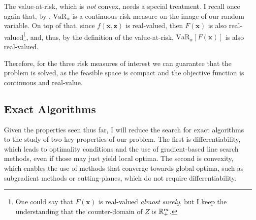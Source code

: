 \documentclass[12pt]{article}
\begin{document}
The value-at-risk, which is \emph{not} convex, needs a special treatment.
I recall once again that, by \citet[Theorem~2]{ivanovBilevelStochasticLinear2014}, $\text{VaR}_{\alpha}$ is a continuous risk measure on the image of our random variable.
On top of that, since $f(\bm{x},\bm{z})$ is real-valued, then $F(\bm{x})$ is also real-valued\footnote{One could say that $F(\bm{x})$ is real-valued \emph{almost surely}, but I keep the understanding that the counter-domain of $Z$ is $\mathbb{R}^{m}_{+}$.}, and, thus, by the definition of the value-at-risk, $\text{VaR}_{\alpha}[F(\bm{x})]$ is also real-valued.

Therefore, for the three risk measures of interest we can guarantee that the problem is solved, as the feasible space is compact and the objective function is continuous and real-value.


\subsection*{Exact Algorithms}

Given the properties seen thus far, I will reduce the search for exact algorithms to the study of two key properties of our problem.
The first is differentiability, which leads to optimality conditions and the use of gradient-based line search methods, even if those may just yield local optima.
The second is convexity, which enables the use of methods that converge towards global optima, such as subgradient methods or cutting-planes, which do not require differentiability.


\end{document}
